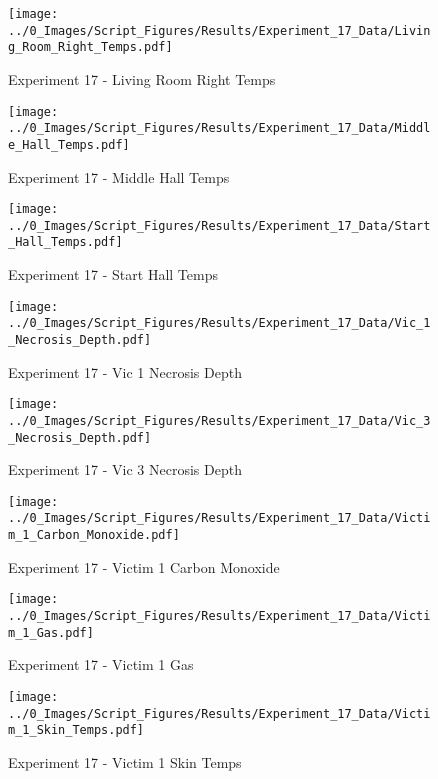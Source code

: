 	\clearpage

	\begin{figure}[H]
		\centering
		\texttt{[image: ../0\_Images/Script\_Figures/Results/Experiment\_17\_Data/Living\_Room\_Right\_Temps.pdf]}
		\caption[]{Experiment 17 - Living Room Right Temps}
	\end{figure}
 

	\begin{figure}[H]
		\centering
		\texttt{[image: ../0\_Images/Script\_Figures/Results/Experiment\_17\_Data/Middle\_Hall\_Temps.pdf]}
		\caption[]{Experiment 17 - Middle Hall Temps}
	\end{figure}
 
	\clearpage

	\begin{figure}[H]
		\centering
		\texttt{[image: ../0\_Images/Script\_Figures/Results/Experiment\_17\_Data/Start\_Hall\_Temps.pdf]}
		\caption[]{Experiment 17 - Start Hall Temps}
	\end{figure}
 

	\begin{figure}[H]
		\centering
		\texttt{[image: ../0\_Images/Script\_Figures/Results/Experiment\_17\_Data/Vic\_1\_Necrosis\_Depth.pdf]}
		\caption[]{Experiment 17 - Vic 1 Necrosis Depth}
	\end{figure}
 
	\clearpage

	\begin{figure}[H]
		\centering
		\texttt{[image: ../0\_Images/Script\_Figures/Results/Experiment\_17\_Data/Vic\_3\_Necrosis\_Depth.pdf]}
		\caption[]{Experiment 17 - Vic 3 Necrosis Depth}
	\end{figure}
 

	\begin{figure}[H]
		\centering
		\texttt{[image: ../0\_Images/Script\_Figures/Results/Experiment\_17\_Data/Victim\_1\_Carbon\_Monoxide.pdf]}
		\caption[]{Experiment 17 - Victim 1 Carbon Monoxide}
	\end{figure}
 
	\clearpage

	\begin{figure}[H]
		\centering
		\texttt{[image: ../0\_Images/Script\_Figures/Results/Experiment\_17\_Data/Victim\_1\_Gas.pdf]}
		\caption[]{Experiment 17 - Victim 1 Gas}
	\end{figure}
 

	\begin{figure}[H]
		\centering
		\texttt{[image: ../0\_Images/Script\_Figures/Results/Experiment\_17\_Data/Victim\_1\_Skin\_Temps.pdf]}
		\caption[]{Experiment 17 - Victim 1 Skin Temps}
	\end{figure}
 
